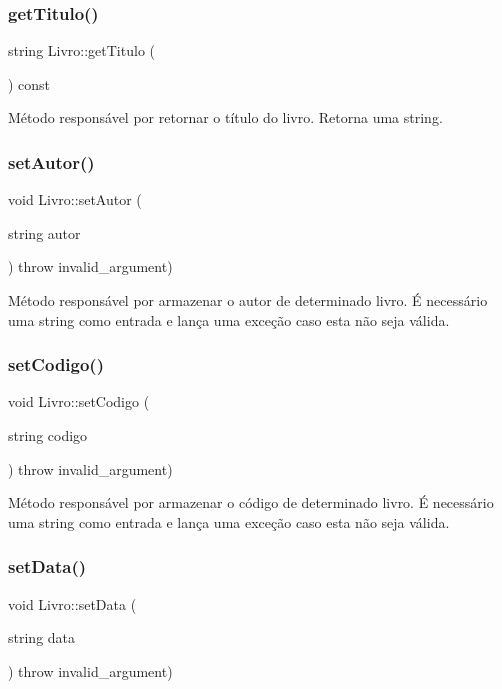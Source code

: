 \subsubsection{\texorpdfstring{get\+Titulo()}{getTitulo()}}
{\footnotesize\ttfamily string Livro\+::get\+Titulo (\begin{DoxyParamCaption}{ }\end{DoxyParamCaption}) const\hspace{0.3cm}{\ttfamily [inline]}}

Método responsável por retornar o título do livro. Retorna uma string. \mbox{\label{classLivro_adcc86bd3488de769173fe872c7949077}} 
\subsubsection{\texorpdfstring{set\+Autor()}{setAutor()}}
{\footnotesize\ttfamily void Livro\+::set\+Autor (\begin{DoxyParamCaption}\item[{string}]{autor }\end{DoxyParamCaption}) throw  invalid\+\_\+argument) }

Método responsável por armazenar o autor de determinado livro. É necessário uma string como entrada e lança uma exceção caso esta não seja válida. \mbox{\label{classLivro_a30b6c41de98f92185b4a5f33dcdf5a66}} 
\subsubsection{\texorpdfstring{set\+Codigo()}{setCodigo()}}
{\footnotesize\ttfamily void Livro\+::set\+Codigo (\begin{DoxyParamCaption}\item[{string}]{codigo }\end{DoxyParamCaption}) throw  invalid\+\_\+argument) }

Método responsável por armazenar o código de determinado livro. É necessário uma string como entrada e lança uma exceção caso esta não seja válida. \mbox{\label{classLivro_a3530e8f2974791461f080563fd332fa0}} 
\subsubsection{\texorpdfstring{set\+Data()}{setData()}}
{\footnotesize\ttfamily void Livro\+::set\+Data (\begin{DoxyParamCaption}\item[{string}]{data }\end{DoxyParamCaption}) throw  invalid\+\_\+argument) }

